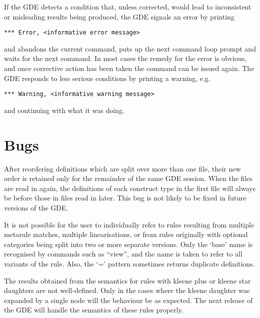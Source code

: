 If the GDE detects a condition that, unless corrected, would lead
to inconsistent or misleading results being produced, the GDE signals
an error by printing 
\begin{ex}
\begin{verbatim}
*** Error, <informative error message>
\end{verbatim}
\end{ex}
and abandons the current command, puts up the next command loop
prompt and waits for the next command. In most
cases the remedy for the error is obvious, and once corrective action
has been taken the command can be issued again. The GDE responds to less
serious conditions by printing a warning, e.g.
\begin{ex}
\begin{verbatim}
*** Warning, <informative warning message>
\end{verbatim}
\end{ex}
and continuing with what it was doing.

\section{Bugs}

After reordering definitions which are split over more than one file,
their new order is retained only for the remainder of the same GDE
session.  When the files are read in again, the definitions of each
construct type in the first file will always be before those in files
read in later. This bug is not likely to be fixed in future versions of
the GDE.

It is not possible for the user to individually refer to rules resulting
from multiple metarule matches, multiple linearisations, or from rules
originally with optional categories being split into two or more
separate versions.  Only the `base' name is recognised by commands
such as ``view'', and the name is taken to refer to all variants of the
rule. Also, the `=' pattern sometimes returns duplicate definitions.

The results obtained from the semantics for rules with kleene plus
or kleene star daughters are not well-defined. Only in the cases
where the kleene daughter was expanded by a single node will
the behaviour be as expected. The next release of the GDE will handle
the semantics of these rules properly.

